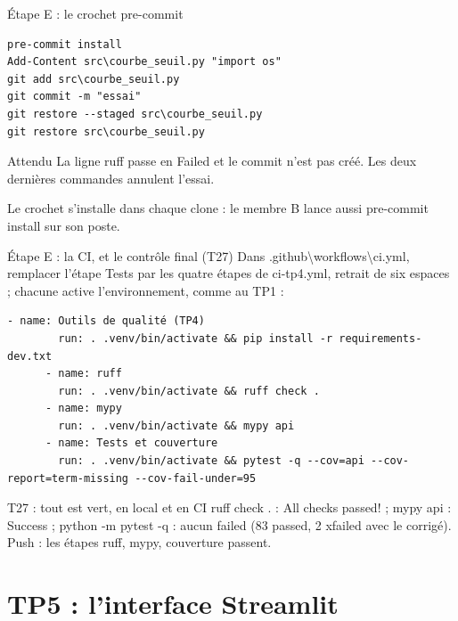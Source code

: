 \documentclass[aspectratio=169,11pt]{beamer}
\newcommand{\co}[1]{{\ttfamily\hyphenchar\font=45\relax #1}}
\newcommand{\bs}{\textbackslash\allowbreak{}}
\begin{document}
\begin{frame}[fragile]{Étape E : le crochet pre-commit}
\begin{lstlisting}
pre-commit install
Add-Content src\courbe_seuil.py "import os"
git add src\courbe_seuil.py
git commit -m "essai"
git restore --staged src\courbe_seuil.py
git restore src\courbe_seuil.py
\end{lstlisting}
\begin{exampleblock}{Attendu}
La ligne \co{ruff} passe en \co{Failed} et le commit n'est pas créé. Les deux dernières commandes annulent
l'essai.
\end{exampleblock}
\small Le crochet s'installe dans chaque clone : le membre B lance aussi \co{pre-commit install} sur son poste.
\end{frame}

\begin{frame}[fragile]{Étape E : la CI, et le contrôle final (T27)}
\small Dans \co{.github\bs workflows\bs ci.yml}, remplacer l'étape \og Tests \fg{} par les quatre étapes de
\co{ci-tp4.yml}, retrait de six espaces ; chacune active l'environnement, comme au TP1 :
\begin{lstlisting}[basicstyle=\ttfamily\tiny]
      - name: Outils de qualité (TP4)
        run: . .venv/bin/activate && pip install -r requirements-dev.txt
      - name: ruff
        run: . .venv/bin/activate && ruff check .
      - name: mypy
        run: . .venv/bin/activate && mypy api
      - name: Tests et couverture
        run: . .venv/bin/activate && pytest -q --cov=api --cov-report=term-missing --cov-fail-under=95
\end{lstlisting}
\begin{exampleblock}{T27 : tout est vert, en local et en CI}
\co{ruff check .} : \co{All checks passed!} ; \co{mypy api} : \co{Success} ; \co{python -m pytest -q} : aucun
\co{failed} (83 passed, 2 xfailed avec le corrigé). Push : les étapes ruff, mypy, couverture passent.
\end{exampleblock}
\end{frame}

\section{TP5 : l'interface Streamlit}
\end{document}
